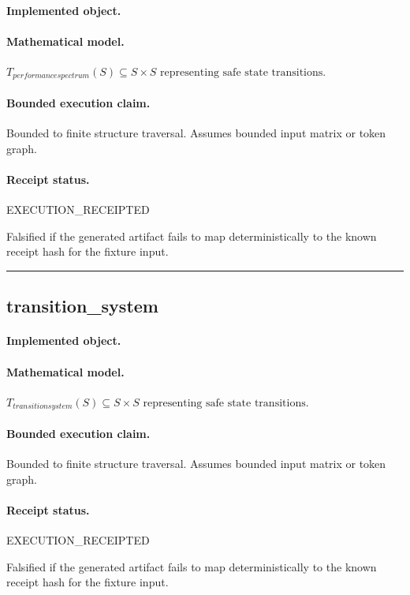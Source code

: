 \paragraph{Implemented object.} 
\paragraph{Mathematical model.} $T_{performancespectrum}(S) \subseteq S \times S \text{ representing safe state transitions}.$
\paragraph{Bounded execution claim.} Bounded to finite structure traversal. Assumes bounded input matrix or token graph.
\paragraph{Receipt status.} EXECUTION\_RECEIPTED
\begin{falsifier}
Falsified if the generated artifact fails to map deterministically to the known receipt hash for the fixture input.
\end{falsifier}

\vspace{1em}\hrule\vspace{1em}
\subsection{transition\_system}
\paragraph{Implemented object.} 
\paragraph{Mathematical model.} $T_{transitionsystem}(S) \subseteq S \times S \text{ representing safe state transitions}.$
\paragraph{Bounded execution claim.} Bounded to finite structure traversal. Assumes bounded input matrix or token graph.
\paragraph{Receipt status.} EXECUTION\_RECEIPTED
\begin{falsifier}
Falsified if the generated artifact fails to map deterministically to the known receipt hash for the fixture input.
\end{falsifier}

